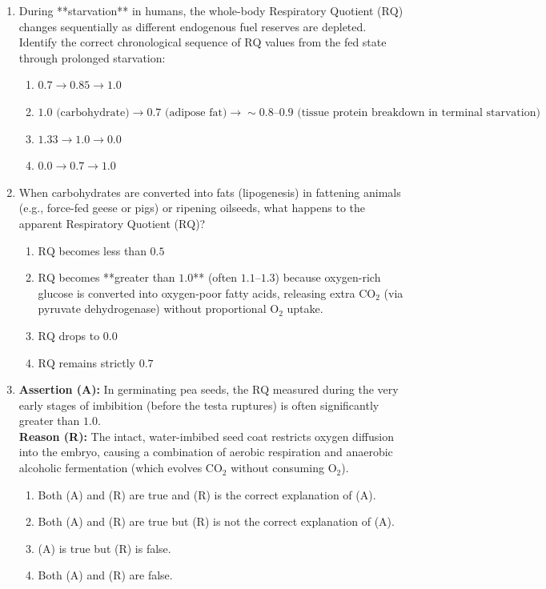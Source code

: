 \documentclass[11pt, a4paper]{article}
\begin{document}
\begin{enumerate}[label=\textbf{\arabic*.}]
\item During **starvation** in humans, the whole-body Respiratory Quotient ($\text{RQ}$) changes sequentially as different endogenous fuel reserves are depleted. Identify the correct chronological sequence of $\text{RQ}$ values from the fed state through prolonged starvation:
\begin{enumerate}[label=(\Alph*)]
    \item $0.7 \rightarrow 0.85 \rightarrow 1.0$
    \item $1.0 \text{ (carbohydrate)} \rightarrow 0.7 \text{ (adipose fat)} \rightarrow \sim 0.8\text{--}0.9 \text{ (tissue protein breakdown in terminal starvation)}$
    \item $1.33 \rightarrow 1.0 \rightarrow 0.0$
    \item $0.0 \rightarrow 0.7 \rightarrow 1.0$
\end{enumerate}

\item When carbohydrates are converted into fats (lipogenesis) in fattening animals (e.g., force-fed geese or pigs) or ripening oilseeds, what happens to the apparent Respiratory Quotient ($\text{RQ}$)?
\begin{enumerate}[label=(\Alph*)]
    \item $\text{RQ}$ becomes less than $0.5$
    \item $\text{RQ}$ becomes **greater than $1.0$** (often $1.1\text{--}1.3$) because oxygen-rich glucose is converted into oxygen-poor fatty acids, releasing extra $\text{CO}_2$ (via pyruvate dehydrogenase) without proportional $\text{O}_2$ uptake.
    \item $\text{RQ}$ drops to $0.0$
    \item $\text{RQ}$ remains strictly $0.7$
\end{enumerate}

\item \textbf{Assertion (A):} In germinating pea seeds, the $\text{RQ}$ measured during the very early stages of imbibition (before the testa ruptures) is often significantly greater than $1.0$. \\
\textbf{Reason (R):} The intact, water-imbibed seed coat restricts oxygen diffusion into the embryo, causing a combination of aerobic respiration and anaerobic alcoholic fermentation (which evolves $\text{CO}_2$ without consuming $\text{O}_2$).
\begin{enumerate}[label=(\Alph*)]
    \item Both (A) and (R) are true and (R) is the correct explanation of (A).
    \item Both (A) and (R) are true but (R) is not the correct explanation of (A).
    \item (A) is true but (R) is false.
    \item Both (A) and (R) are false.
\end{enumerate}


\end{enumerate}
\end{document}
